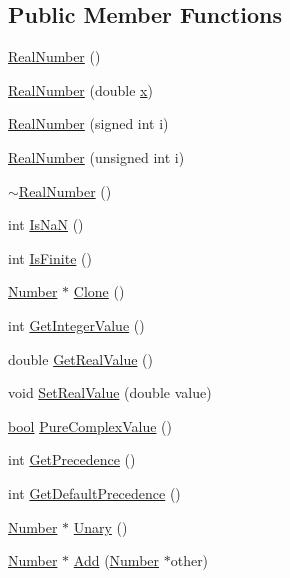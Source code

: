 \subsection*{Public Member Functions}
\begin{DoxyCompactItemize}
\item 
\hyperlink{structRealNumber_aa61264f519c95ec9b63ab94c352bcc67}{Real\+Number} ()
\item 
\hyperlink{structRealNumber_a65924261adb775498f3b1b0f41f89091}{Real\+Number} (double \hyperlink{structRealNumber_ac33d80bee75448490199a0aa48ccce1e}{x})
\item 
\hyperlink{structRealNumber_ab4c47ea1155b9ee8b4a2794e7836f892}{Real\+Number} (signed int i)
\item 
\hyperlink{structRealNumber_a93eaa240f780acbe5e8e0eedb52483cc}{Real\+Number} (unsigned int i)
\item 
\hyperlink{structRealNumber_a970623f00512c4ea09b5b5762ccc9bf5}{$\sim$\+Real\+Number} ()
\item 
int \hyperlink{structRealNumber_a250356e32a8c743cc2bc0baa73980ab4}{Is\+NaN} ()
\item 
int \hyperlink{structRealNumber_a52cb76fb0b8f7a91a44172473a509656}{Is\+Finite} ()
\item 
\hyperlink{structNumber}{Number} $\ast$ \hyperlink{structRealNumber_a8b089754dcdf9aab37ca9451ae918a9f}{Clone} ()
\item 
int \hyperlink{structRealNumber_ad70a0d7f6886d62194d2f0829384b902}{Get\+Integer\+Value} ()
\item 
double \hyperlink{structRealNumber_aeb08b00ac6cc793835c14e7bbbc65484}{Get\+Real\+Value} ()
\item 
void \hyperlink{structRealNumber_a47b13da91334faba56ece7292f3a8566}{Set\+Real\+Value} (double value)
\item 
\hyperlink{platform_8h_a1062901a7428fdd9c7f180f5e01ea056}{bool} \hyperlink{structRealNumber_ae80613d0522ada8c2f1d27115e5821be}{Pure\+Complex\+Value} ()
\item 
int \hyperlink{structRealNumber_ae809f7a1a8d6bf48bbbc808a7ae0474a}{Get\+Precedence} ()
\item 
int \hyperlink{structRealNumber_aa737c13eb4e7e0cbb1113488d21d91cf}{Get\+Default\+Precedence} ()
\item 
\hyperlink{structNumber}{Number} $\ast$ \hyperlink{structRealNumber_a0370c55b92e3ec36270a894918ae53ca}{Unary} ()
\item 
\hyperlink{structNumber}{Number} $\ast$ \hyperlink{structRealNumber_aca23ac8d11fe2c35ea05bfc10ee14ebe}{Add} (\hyperlink{structNumber}{Number} $\ast$other)

\end{DoxyCompactItemize}
